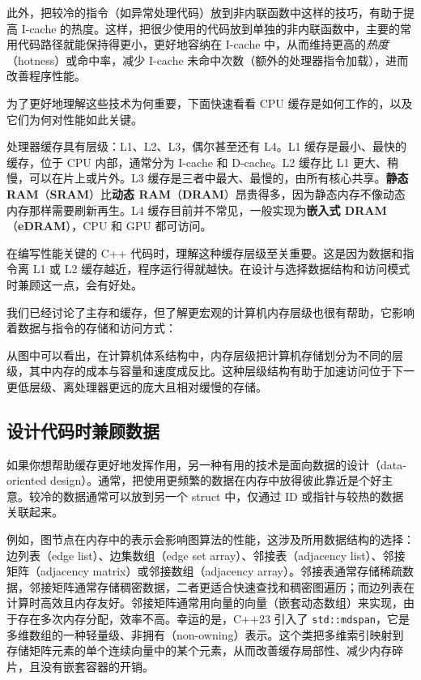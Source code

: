 \label{idx:1226}
此外，把较冷的指令（如异常处理代码）放到非内联函数中这样的技巧，有助于提高 I-cache 的热度。这样，把很少使用的代码放到单独的非内联函数中，主要的常用代码路径就能保持得更小，更好地容纳在 I-cache 中，从而维持更高的\emph{热度}（hotness）或命中率，减少 I-cache 未命中次数（额外的处理器指令加载），进而改善程序性能。

为了更好地理解这些技术为何重要，下面快速看看 CPU 缓存是如何工作的，以及它们为何对性能如此关键。


\label{idx:1227}
处理器缓存具有层级：L1、L2、L3，偶尔甚至还有 L4。L1 缓存是最小、最快的缓存，位于 CPU 内部，通常分为 I-cache 和 D-cache。L2 缓存比 L1 更大、稍慢，可以在片上或片外。L3 缓存是三者中最大、最慢的，由所有核心共享。\textbf{静态 RAM}（\textbf{SRAM}）比\textbf{动态 RAM}（\textbf{DRAM}）昂贵得多，因为静态内存不像动态内存那样需要刷新再生。L4 缓存目前并不常见，一般实现为\textbf{嵌入式 DRAM}（\textbf{eDRAM}），CPU 和 GPU 都可访问。

在编写性能关键的 C++ 代码时，理解这种缓存层级至关重要。这是因为数据和指令离 L1 或 L2 缓存越近，程序运行得就越快。在设计与选择数据结构和访问模式时兼顾这一点，会有好处。

\label{idx:1228}
我们已经讨论了主存和缓存，但了解更宏观的计算机内存层级也很有帮助，它影响着数据与指令的存储和访问方式：


从图中可以看出，在计算机体系结构中，内存层级把计算机存储划分为不同的层级，其中内存的成本与容量和速度成反比。这种层级结构有助于加速访问位于下一更低层级、离处理器更远的庞大且相对缓慢的存储。

\subsection{设计代码时兼顾数据}

\label{idx:1229}
如果你想帮助缓存更好地发挥作用，另一种有用的技术是面向数据的设计（data-oriented design）。通常，把使用更频繁的数据在内存中放得彼此靠近是个好主意。较冷的数据通常可以放到另一个 struct 中，仅通过 ID 或指针与较热的数据关联起来。

例如，图节点在内存中的表示会影响图算法的性能，这涉及所用数据结构的选择：边列表（edge list）、边集数组（edge set array）、邻接表（adjacency list）、邻接矩阵（adjacency matrix）或邻接数组（adjacency array）。邻接表通常存储稀疏数据，邻接矩阵通常存储稠密数据，二者更适合快速查找和稠密图遍历；而边列表在计算时高效且内存友好。邻接矩阵通常用向量的向量（嵌套动态数组）来实现，由于存在多次内存分配，效率不高。幸运的是，C++23 引入了 \texttt{std::\allowbreak{}mdspan}，它是多维数组的一种轻量级、非拥有（non-owning）表示。这个类把多维索引映射到存储矩阵元素的单个连续向量中的某个元素，从而改善缓存局部性、减少内存碎片，且没有嵌套容器的开销。

